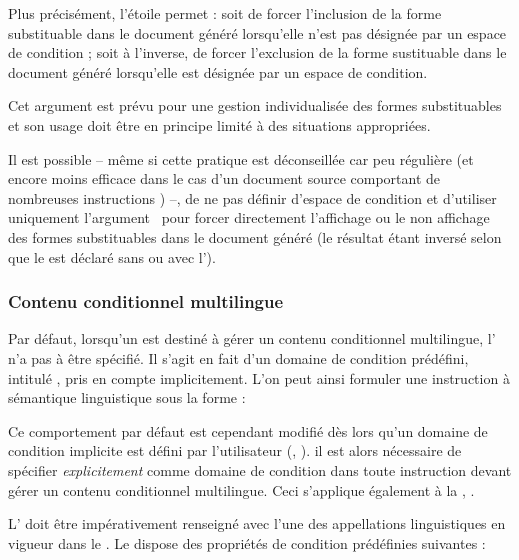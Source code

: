 \documentclass{article}
\begin{document}
Plus précisément, l'étoile permet : soit de forcer l'inclusion de la forme substituable dans le document généré lorsqu'elle n'est pas désignée par un espace de condition ; soit à l'inverse, de forcer l'exclusion de la forme sustituable dans le document généré lorsqu'elle est désignée par un espace de condition.

Cet argument est prévu pour une gestion individualisée  des formes substituables et son usage doit être en principe limité à des situations appropriées.

Il est possible -- même si cette pratique est déconseillée car peu régulière (et encore moins efficace dans le cas d'un document source comportant de nombreuses instructions ) --, de ne pas définir d'espace de condition et d'utiliser uniquement l'argument~\val{*} pour forcer directement l'affichage ou le non affichage des formes substituables dans le document généré (le résultat étant inversé selon que le  est déclaré sans ou avec l').

\subsubsection{Contenu conditionnel multilingue}\label{CtDoc_Commandes_CondiText_Multilingue}
Par défaut, lorsqu'un  est destiné à gérer un contenu conditionnel multilingue, l' n'a pas à être spécifié. Il s'agit en fait d'un domaine de condition prédéfini, intitulé , pris en compte implicitement. L'on peut ainsi formuler une instruction  à sémantique linguistique sous la forme :


Ce comportement par défaut est cependant modifié dès lors qu'un domaine de condition implicite est défini par l'utilisateur (, ). il est alors nécessaire de spécifier \emph{explicitement}  comme domaine de condition dans toute instruction  devant gérer un contenu conditionnel multilingue. Ceci s'applique également à la , .

L' doit être impérativement renseigné avec l'une des appellations linguistiques en vigueur dans le . Le  dispose des propriétés de condition prédéfinies suivantes :
\end{document}
